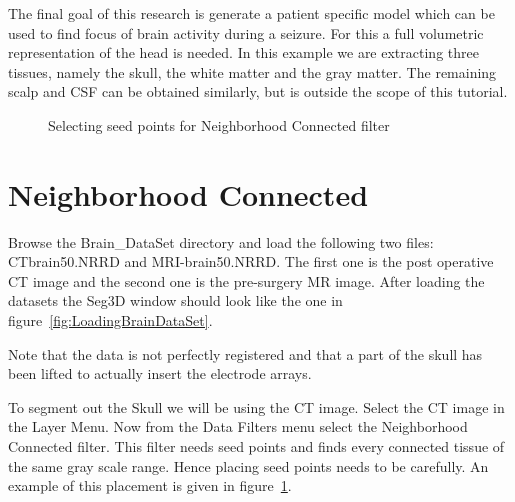 \documentclass[fleqn,11pt,openany]{book}
\begin{document}
The final goal of this research is generate a patient specific model which can be used to find focus of brain activity during a seizure. For this a full volumetric representation of the head is needed. In this example we are extracting three tissues, namely the skull, the white matter and the gray matter. The remaining scalp and CSF can be obtained similarly, but is outside the scope of this tutorial.

\begin{figure}
\caption{Selecting seed points for Neighborhood Connected filter}\label{fig:NeighborhoodConnected}
\end{figure}
\section{Neighborhood Connected}

Browse the Brain\_DataSet directory and load the following two files: CTbrain50.NRRD and MRI-brain50.NRRD. The first one is the post operative CT image and the second one is the pre-surgery MR image. After loading the datasets the Seg3D window should look like the one in figure~\ref{fig:LoadingBrainDataSet}. 

Note that the data is not perfectly registered and that a part of the skull has been lifted to actually insert the electrode arrays.

To segment out the Skull we will be using the CT image. Select the CT image in the Layer Menu. Now from the Data
 Filters menu select the Neighborhood Connected filter. This filter needs seed points and finds every connected tissue of the same gray scale range. Hence placing seed points needs to be carefully. An example of this placement is given in figure~\ref{fig:NeighborhoodConnected}. 
\end{document}
